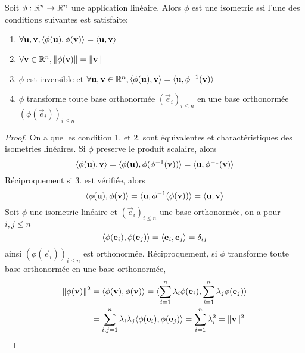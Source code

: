 \begin{theorem}
	Soit $\phi: \mathbb{R}^n \to \mathbb{R}^n$ une application linéaire. Alors $\phi$ est une
	isometrie ssi l'une des conditions suivantes est satisfaite:
	\begin{enumerate}
		\item $\forall \mathbf{u}, \mathbf{v}, \langle \phi(\mathbf{u}), \phi(\mathbf{v}) \rangle
			= \langle \mathbf{u}, \mathbf{v} \rangle$
		\item $\forall \mathbf{v} \in \mathbb{R}^n, \|\phi(\mathbf{v})\| = \|\mathbf{v}\|$
		\item $\phi$ est inversible et $\forall \mathbf{u}, \mathbf{v} \in \mathbb{R}^n,
			\langle \phi(\mathbf{u}), \mathbf{v} \rangle = \langle \mathbf{u}, \phi^{-1}(\mathbf{v}) \rangle$
		\item $\phi$ transforme toute base orthonormée $(\vec{e}_i)_{i\leq n}$ en
			une base orthonormée $(\phi(\vec{e}_i))_{i\leq n}$
	\end{enumerate}
\end{theorem}

\begin{proof}
	On a que les condition 1. et 2. sont équivalentes et charactéristiques des
	isometries linéaires. Si $\phi$ preserve le produit scalaire, alors
	\begin{equation*}
		\langle \phi(\mathbf{u}), \mathbf{v} \rangle =
		\langle \phi(\mathbf{u}), \phi(\phi^{-1}(\mathbf{v})) \rangle =
		\langle \mathbf{u}, \phi^{-1}(\mathbf{v}) \rangle
	\end{equation*}
	Réciproquement si 3. est vérifiée, alors
	\begin{equation*}
		\langle \phi(\mathbf{u}), \phi(\mathbf{v}) \rangle =
		\langle \mathbf{u}, \phi^{-1}(\phi(\mathbf{v})) \rangle =
		\langle \mathbf{u}, \mathbf{v} \rangle
	\end{equation*}
	Soit $\phi$ une isometrie linéaire et $(\vec{e}_i)_{i\leq n}$ une base
	orthonormée, on a pour $i, j \leq n$
	\begin{equation*}
		\langle \phi(\mathbf{e}_i), \phi(\mathbf{e}_j) \rangle = \langle \mathbf{e}_i, \mathbf{e}_j \rangle =
		\delta_{ij}
	\end{equation*}
	ainsi $(\phi(\vec{e}_i))_{i\leq n}$ est orthonormée. Réciproquement, si
	$\phi$ transforme toute base orthonormée en une base orthonormée,
	\begin{align*}
		\|\phi(\mathbf{v)}\|^2 &= \langle \phi(\mathbf{v}), \phi(\mathbf{v}) \rangle = 
		\langle \sum_{i=1}^n \lambda_i\phi(\mathbf{e}_i), \sum_{i=1}^n
		\lambda_j\phi(\mathbf{e}_j) \rangle\\
		&= \sum_{i,j=1}^n\lambda_i\lambda_j\langle \phi(\mathbf{e}_i), \phi(\mathbf{e}_j) \rangle
		= \sum_{i=1}^n\lambda_i^2 = \|\mathbf{v}\|^2
	\end{align*}
\end{proof}

